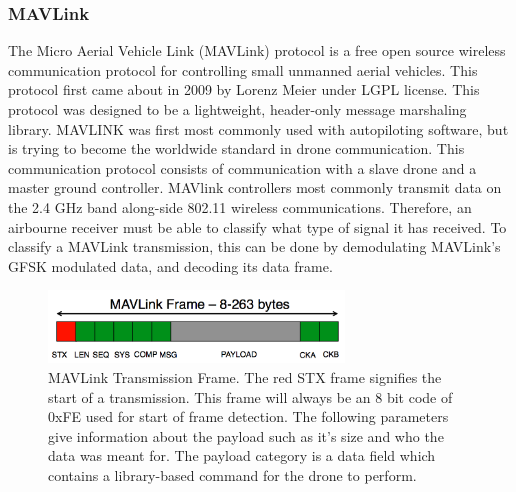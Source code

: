 \subsubsection{MAVLink}
The Micro Aerial Vehicle Link (MAVLink) protocol is a free open source wireless communication protocol for controlling small unmanned aerial vehicles. This protocol first came about in 2009 by Lorenz Meier under LGPL license. \cite{MAVLINK_Website}  This protocol was designed to be a lightweight, header-only message marshaling library.  MAVLINK was first most commonly used with autopiloting software, but is trying to become the worldwide standard in drone communication. This communication protocol consists of communication with a slave drone and a master ground controller.  MAVlink controllers most commonly transmit data on the 2.4 GHz band along-side 802.11 wireless communications. Therefore, an airbourne receiver must be able to classify what type of signal it has received. To classify a MAVLink transmission, this can be done by demodulating MAVLink's GFSK modulated data, and decoding its data frame. 
\begin{figure}[ht]
\centering
\includegraphics[width=0.70\textwidth]{img/mavlink-packet.png}
\caption{MAVLink Transmission Frame. The red STX frame signifies the start of a transmission. This frame will always be an 8 bit code of 0xFE used for start of frame detection. The following parameters give information about the payload such as it's size and who the data was meant for.  The payload category is a data field which contains a library-based command for the drone to perform.}
\label{fig:MAVlink_frame}
\end{figure} \par
